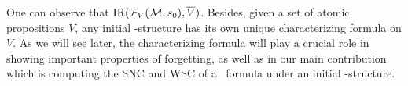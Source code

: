 \documentclass{article}
\begin{document}


One can observe that $\textrm{IR}({\cal F}_V({\cal M}, s_0), \overline V)$.
Besides, given a set of atomic propositions $V$, any initial \MPK-structure has its own unique characterizing formula on $V$. As we will see later, the characterizing formula will play a crucial role in showing important properties of forgetting, as well as in our main contribution which is  computing the SNC and WSC of a \CTL\ formula under an initial \MPK-structure.


\end{document}
